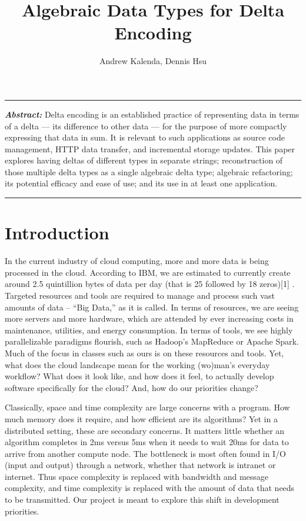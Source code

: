 \documentclass[12pt,a4paper]{article}
\renewenvironment{abstract}{%
	\hfill\begin{minipage}{0.95\textwidth}
		\rule{\textwidth}{1pt}}
	{\par\noindent\rule{\textwidth}{1pt}\end{minipage}}
\begin{document}
	\title{Algebraic Data Types for Delta Encoding}
	\author{Andrew Kalenda, Dennis Hsu}
	\maketitle
	\begin{abstract}
	\textbf{\textit{Abstract:}} Delta encoding is an established practice of representing data in terms of a delta --- its difference to other data --- for the purpose of more compactly expressing that data in sum. It is relevant to such applications as source code management, HTTP data transfer, and incremental storage updates. This paper explores having deltas of different types in separate strings; reconstruction of those multiple delta types as a single algebraic delta type; algebraic refactoring; its potential efficacy and ease of use; and its use in at least one application.
	\end{abstract}
	
	\section{Introduction}
	
	In the current industry of cloud computing, more and more data is being processed in the cloud. According to IBM, we are estimated to currently create around 2.5 quintillion bytes of data per day (that is 25 followed by 18 zeros)[1] . Targeted resources and tools are required to manage and process such vast amounts of data -- “Big Data,” as it is called. In terms of resources, we are seeing more servers and more hardware, which are attended by ever increasing costs in maintenance, utilities, and energy consumption. In terms of tools, we see highly parallelizable paradigms flourish, such as Hadoop’s MapReduce or Apache Spark. Much of the focus in classes such as ours is on these resources and tools. Yet, what does the cloud landscape mean for the working (wo)man’s everyday workflow? What does it look like, and how does it feel, to actually develop software specifically for the cloud? And, how do our priorities change?
		
	Classically, space and time complexity are large concerns with a program. How much memory does it require, and how efficient are its algorithms? Yet in a distributed setting, these are secondary concerns. It matters little whether an algorithm completes in 2ms versus 5ms when it needs to wait 20ms for data to arrive from another compute node. The bottleneck is most often found in I/O (input and output) through a network, whether that network is intranet or internet. Thus space complexity is replaced with bandwidth and message complexity, and time complexity is replaced with the amount of data that needs to be transmitted. Our project is meant to explore this shift in development priorities.
	
\end{document}
